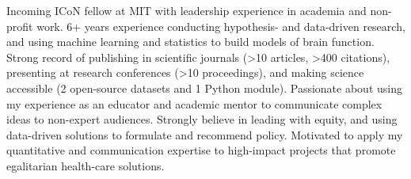 

\begin{cvparagraph}

Incoming ICoN fellow at MIT with leadership experience in academia and non-profit work. 6+ years experience conducting hypothesis- and data-driven research, and using machine learning and statistics to build models of brain function. Strong record of publishing in scientific journals (>10 articles, >400 citations), presenting at research conferences (>10 proceedings), and making science accessible (2 open-source datasets and 1 Python module). Passionate about using my experience as an educator and academic mentor to communicate complex ideas to non-expert audiences. Strongly believe in leading with equity, and using data-driven solutions to formulate and recommend policy. Motivated to apply my quantitative and communication expertise to high-impact projects that promote egalitarian health-care solutions. 

\end{cvparagraph}
